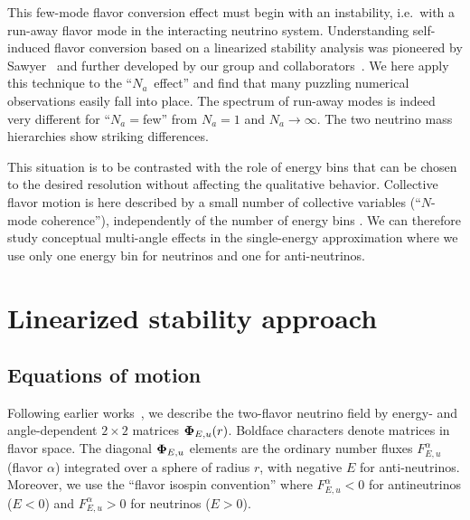 \documentclass[twocolumn,prd,showpacs,
floatfix,preprintnumbers,nofootinbib]{revtex4}
\begin{document}
This few-mode flavor conversion effect must begin with an
instability, i.e.\ with a run-away flavor mode in the interacting
neutrino system. Understanding self-induced flavor conversion based
on a linearized stability analysis was pioneered by
Sawyer~\cite{Sawyer:2008zs} and further developed by our group and
collaborators~\cite{Banerjee:2011fj, Sarikas:2011am}. We here apply
this technique to the \hbox{``$N_a$ effect''} and find that many
puzzling numerical observations easily fall into place. The spectrum
of run-away modes is indeed very different for ``$N_a={}$few'' from
$N_a=1$ and $N_a\to\infty$. The two neutrino mass hierarchies show
striking differences.

This situation is to be contrasted with the role of energy bins that
can be chosen to the desired resolution without affecting the
qualitative behavior. Collective flavor motion is here described by
a small number of collective variables (``$N$-mode coherence''),
independently of the number of energy bins \cite{Raffelt:2010za,
Raffelt:2011yb, Yuzbashyan:2008}. We can therefore study conceptual
multi-angle effects in the single-energy approximation where we use
only one energy bin for neutrinos and one for anti-neutrinos.


\clearpage

\section{Linearized stability approach}
\label{sec:linearized}

\subsection{Equations of motion}

Following earlier works~\cite{EstebanPretel:2008ni, Banerjee:2011fj,
Sarikas:2011am}, we describe the two-flavor neutrino field by
energy- and angle-dependent $2{\times}2$ matrices
${\bf\Phi}_{E,u}(r)$. Boldface characters denote matrices in flavor
space. The diagonal ${\bf\Phi}_{E,u}$ elements are the ordinary
number fluxes $F_{E,u}^\alpha$ (flavor $\alpha$) integrated over a
sphere of radius $r$, with negative $E$ for anti-neutrinos.
Moreover, we use the ``flavor isospin convention'' where
$F_{E,u}^\alpha<0$ for antineutrinos ($E<0$) and $F_{E,u}^\alpha>0$
for neutrinos ($E>0$). 
\end{document}
